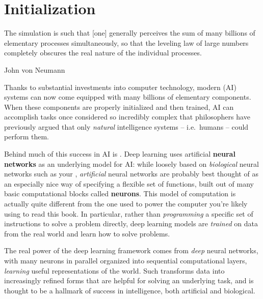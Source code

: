
\chapter{Initialization}
\label{ch:introduction}

\epigraph{The simulation is such that [one] generally perceives the sum of many billions of elementary processes simultaneously, so that the leveling law of large numbers completely obscures the real nature of the individual processes.}{John von Neumann \cite{von2018mathematical}}











\noindent{}Thanks to substantial investments into computer technology, modern  (AI) systems can now come equipped with many billions of elementary components. When these components are properly 
initialized 
and then trained, AI can accomplish tasks once considered so incredibly complex that philosophers have previously argued that only \emph{natural} intelligence systems -- i.e.~humans -- could perform them. 


Behind much of this success in AI is . Deep learning uses artificial \textbf{neural networks} as an underlying model for AI: while loosely based on \emph{biological} neural networks such as your , \emph{artificial} neural networks are probably best thought of as an especially nice way of specifying a flexible set of functions, built out of many basic computational blocks called \textbf{neurons}. This model of computation is actually quite different from the one used to power the computer you're likely using to read this book. In particular, rather than \emph{programming} a specific set of instructions to solve a problem directly, deep learning models  are \emph{trained}
on data from the real world and learn how to solve problems.




The real power of the deep learning framework comes from \emph{deep} neural networks, with many neurons in parallel organized into sequential computational layers,  \emph{learning} useful representations of the world. 
Such  transforms data into increasingly refined forms that are helpful for solving an underlying task, and is thought to be a hallmark of success in intelligence, both artificial and biological.













